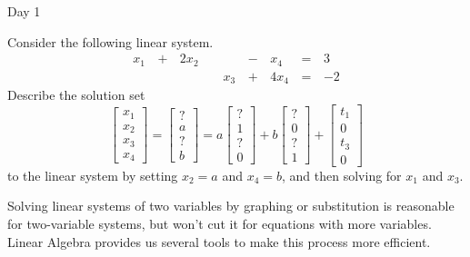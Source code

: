\begin{applicationActivities}{Day 1}
\begin{activity}{0}
  Consider the following linear system.
  \begin{alignat*}{5}
    x_1 &\,+\,& 2x_2 &\, \,&     &\,-\,&  x_4 &\,=\,& 3 \\
        &\, \,&      &\, \,& x_3 &\,+\,& 4x_4 &\,=\,& -2
  \end{alignat*}
  Describe the solution set
  \[
    \begin{bmatrix}
      x_1 \\
      x_2 \\
      x_3 \\
      x_4
    \end{bmatrix}=
    \begin{bmatrix}
      ? \\
      a \\
      ? \\
      b
    \end{bmatrix}=
    a\begin{bmatrix}
      ? \\
      1 \\
      ? \\
      0
    \end{bmatrix}+
    b\begin{bmatrix}
      ? \\
      0 \\
      ? \\
      1
    \end{bmatrix}+
    \begin{bmatrix}
      t_1 \\
      0 \\
      t_3 \\
      0
    \end{bmatrix}
  \] to the linear system
  by setting \(x_2=a\) and \(x_4=b\), and then solving for \(x_1\) and
  \(x_3\).
\end{activity}

\begin{observation}
  Solving linear systems of two variables by graphing or substitution is
  reasonable for two-variable systems, but won't cut it for equations with
  more variables. Linear Algebra provides us several tools to make this
  process more efficient.
\end{observation}


\end{applicationActivities}
